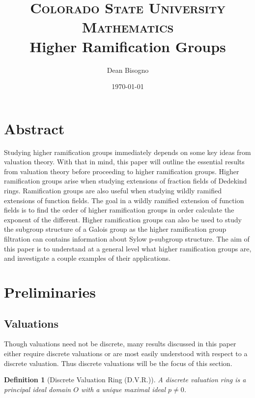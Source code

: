 \documentclass[paper=a4, fontsize=11pt]{scrartcl} %
\title{	
\normalfont \normalsize 
\textsc{Colorado State University Mathematics} \\ [25pt] %
\huge Higher Ramification Groups \\ %
}
\author{Dean Bisogno} %
\date{\normalsize\today} %
\numberwithin{equation}{section} %
\numberwithin{figure}{section} %
\numberwithin{table}{section} %
\theoremstyle{break}
\newtheorem{defn}{Definition}
\begin{document}
\maketitle %
\section{Abstract}
Studying higher ramification groups immediately depends on some key ideas from valuation theory. With that in mind, this paper will outline the essential results from valuation theory before proceeding to higher ramification groups. Higher ramification groups arise when studying extensions of fraction fields of Dedekind rings. Ramification groups are also useful when studying wildly ramified extensions of function fields. The goal in a wildly ramified extension of function fields is to find the order of higher ramification groups in order calculate the exponent of the different. Higher ramification groups can also be used to study the subgroup structure of a Galois group as the higher ramification group filtration can contains information about Sylow p-subgroup structure. The aim of this paper is to understand at a general level what higher ramification groups are, and investigate a couple examples of their applications.
\section{Preliminaries}
\subsection{Valuations}
Though valuations need not be discrete, many results discussed in this paper either require discrete valuations or are most easily understood with respect to a discrete valuation. Thus discrete valuations will be the focus of this section.
\begin{defn}[Discrete Valuation Ring (D.V.R.)]
A discrete valuation ring is a principal ideal domain $O$ with a unique maximal ideal $p \not= 0$.
\end{defn}
\end{document}
